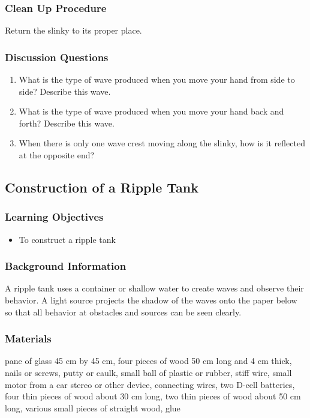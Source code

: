 \subsubsection*{Clean Up Procedure}
Return the slinky to its proper place.

\subsubsection*{Discussion Questions}
\begin{enumerate}
\item{What is the type of wave produced when you move your hand from side to side? Describe this wave.} 
\item{What is the type of wave produced when you move your hand back and forth? Describe this wave.} 
\item{When there is only one wave crest moving along the slinky, how is it reflected at the opposite end?}
\end{enumerate}


\subsection{Construction of a Ripple Tank}

\subsubsection*{Learning Objectives}
\begin{itemize}
\item{To construct a ripple tank} 
\end{itemize}

\subsubsection*{Background Information}
A ripple tank uses a container or shallow water to create waves and observe their behavior. A light source projects the shadow of the waves onto the paper below so that all behavior at obstacles and sources can be seen clearly.

\subsubsection*{Materials}
pane of glass 45 cm by 45 cm, four pieces of wood 50 cm long and 4 cm thick, nails or screws, putty or caulk, small ball of plastic or rubber, stiff wire, small motor from a car stereo or other device, connecting wires, two D-cell batteries, four thin pieces of wood about 30 cm long, two thin pieces of wood about 50 cm long, various small pieces of straight wood, glue



